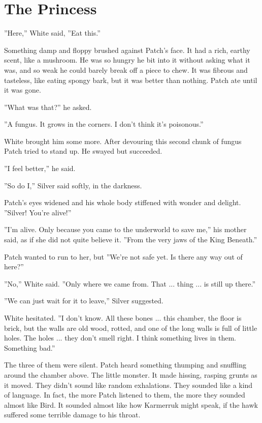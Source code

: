 \documentclass[12pt]{book}
\begin{document}
\section{The Princess}

 ''Here,'' White said, ''Eat this.''\par
 Something damp and floppy brushed against Patch's face. It had a rich, earthy scent, like a mushroom. He was so hungry he bit into it without asking what it was, and so weak he could barely break off a piece to chew. It was fibrous and tasteless, like eating spongy bark, but it was better than nothing. Patch ate until it was gone.\par
 ''What was that?'' he asked.\par
 ''A fungus. It grows in the corners. I don't think it's poisonous.''\par
 White brought him some more. After devouring this second chunk of fungus Patch tried to stand up. He swayed but succeeded.\par
''I feel better,'' he said.\par
 ''So do I,'' Silver said softly, in the darkness.\par
 Patch's eyes widened and his whole body stiffened with wonder and delight. ''Silver! You're alive!''\par
 ''I'm alive. Only because you came to the underworld to save me,'' his mother said, as if she did not quite believe it. ''From the very jaws of the King Beneath.''\par
 Patch wanted to run to her, but %
 ''We're not safe yet. Is there any way out of here?''\par
 ''No,'' White said. ''Only where we came from. That ... thing ... is still up there.''\par
 ''We can just wait for it to leave,'' Silver suggested.\par
 White hesitated. ''I don't know. All these bones ... this chamber, the floor is brick, but the walls are old wood, rotted, and one of the long walls is full of little holes. The holes ... they don't smell right. I think something lives in them. Something bad.''\par
 The three of them were silent. Patch heard something thumping and snuffling around the chamber above. The little monster. It made hissing, rasping grunts as it moved. They didn't sound like random exhalations. They sounded like a kind of language. In fact, the more Patch listened to them, the more they sounded almost like Bird. It sounded almost like how Karmerruk might speak, if the hawk suffered some terrible damage to his throat.\par
\end{document}
